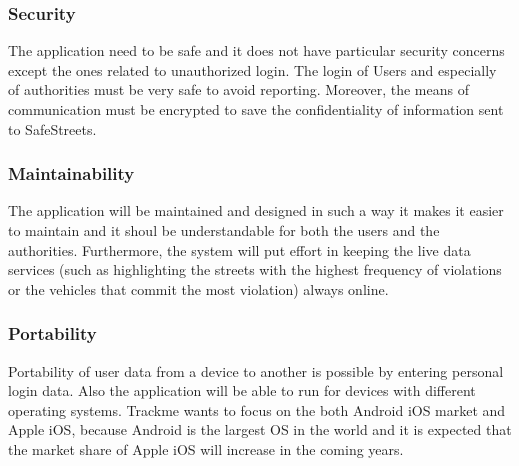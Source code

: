 \subsubsection{Security}
The application need to be safe and it does not have particular security concerns except the ones related to unauthorized login. The login of Users and especially of authorities must be very safe to avoid reporting. Moreover, the means of communication must be encrypted to save the confidentiality of information sent to SafeStreets.
\subsubsection{Maintainability}
The application will be maintained and designed in such a way it makes it easier to maintain and it shoul be understandable for both the users and the authorities. Furthermore, the system will put eﬀort in keeping the live data services (such as highlighting the streets with the highest frequency of violations or the vehicles that commit the most violation) always online.
\subsubsection{Portability}
Portability of user data from a device to another is possible by entering personal login data. Also the application will be able to run for devices with different operating systems. Trackme wants to focus on the both Android iOS market and Apple iOS, because Android is the largest OS in the world and it is expected that the market share of Apple iOS will increase in the coming years.
